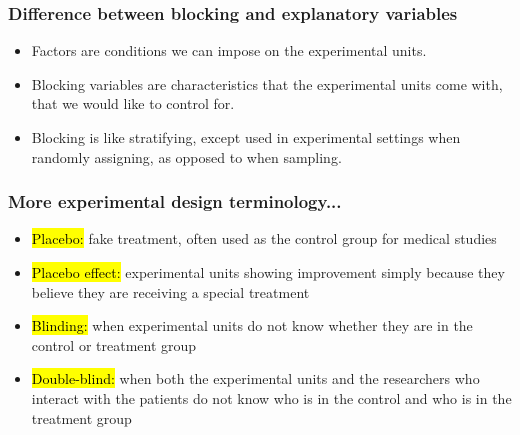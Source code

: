 
\begin{frame}
\frametitle{Difference between blocking and explanatory variables}

\begin{itemize}

\item Factors are conditions we can impose on the experimental units.

\item Blocking variables are characteristics that the experimental units come with, that we would like to control for.

\item Blocking is like stratifying, except used in experimental settings when randomly assigning, as opposed to when sampling.

\end{itemize}

\end{frame}


\begin{frame}
\frametitle{More experimental design terminology...}

\begin{itemize}

\item \hl{Placebo:} fake treatment, often used as the control group for medical studies

\item \hl{Placebo effect:} experimental units showing improvement simply because they believe they are receiving a special treatment

\item \hl{Blinding:} when experimental units do not know whether they are in the control or treatment group

\item \hl{Double-blind:} when both the experimental units and the researchers who interact with the patients do not know who is in the control and who is in the treatment group

\end{itemize}

\end{frame}


